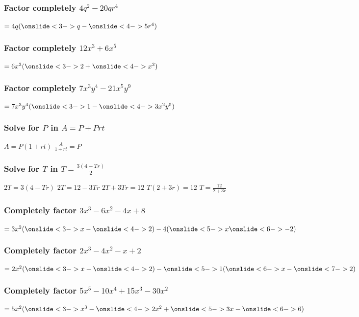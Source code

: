 \documentclass{beamer}
\begin{document}
\begin{frame}
\frametitle{Factor completely $4q^2-20qr^4$}
\pause $=4q(\onslide<3->{q}-\onslide<4->{5r^4})$
\end{frame}

\begin{frame}
\frametitle{Factor completely $12x^3+6x^5$}
\pause $=6x^3(\onslide<3->{2}+\onslide<4->{x^2})$
\end{frame}

\begin{frame}
\frametitle{Factor completely $7x^3y^4-21x^5y^9$}
\pause $=7x^3y^4(\onslide<3->{1}-\onslide<4->{3x^2y^5})$
\end{frame}

\begin{frame}
\frametitle{Solve for $P$ in $A = P + Prt$}
\pause $A = P(1 + rt)$ \vskip4pt
\pause $\frac{A}{1 + rt}=P$
\end{frame}

\begin{frame}
\frametitle{Solve for $T$ in $T = \frac{3(4-Tr)}{2}$}
\pause $2T = 3(4-Tr)$ \vskip4pt
\pause $2T = 12 - 3Tr$ \vskip4pt
\pause $2T + 3Tr = 12$ \vskip4pt
\pause $T(2 + 3r) = 12$ \vskip4pt
\pause $T = \frac{12}{2 + 3r}$
\end{frame}

\begin{frame}
\frametitle{Completely factor $3x^3-6x^2-4x+8$}
\pause $=3x^2(\onslide<3->{x}-\onslide<4->{2})-4(\onslide<5->{x}\onslide<6->{-2})$ \vskip4pt
\end{frame}

\begin{frame}
\frametitle{Completely factor $2x^3-4x^2-x+2$}
\pause $=2x^2(\onslide<3->{x}-\onslide<4->{2})-\onslide<5->{1}(\onslide<6->{x}-\onslide<7->{2})$ \vskip4pt
\end{frame}

\begin{frame}
\frametitle{Completely factor $5x^5-10x^4+15x^3-30x^2$}
\pause $=5x^2(\onslide<3->{x^3}-\onslide<4->{2x^2}+\onslide<5->{3x}-\onslide<6->{6})$ \vskip4pt
 \vskip4pt
\end{frame}

\begin{frame}
\frametitle{}
\end{frame}
\end{document}
